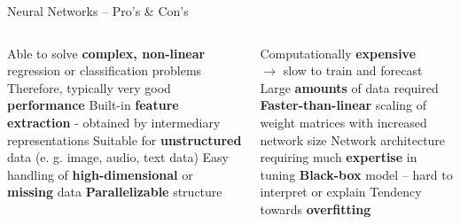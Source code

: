 \begin{frame}{Neural Networks -- Pro's \& Con's}

\footnotesize

\begin{columns}[onlytextwidth]
  \begin{column}{0.5\textwidth}
    \footnotesize
    \begin{itemize}
      \positem Able to solve \textbf{complex, non-linear} regression or 
      classification problems
      \positem Therefore, typically very good \textbf{performance}
      \positem Built-in \textbf{feature extraction} - obtained by intermediary
      representations
      \positem Suitable for \textbf{unstructured} data (e. g. image, audio, 
      text data)
      \positem Easy handling of \textbf{high-dimensional} or \textbf{missing} 
      data
      \positem \textbf{Parallelizable} structure
    \end{itemize}
  \end{column}

  \begin{column}{0.5\textwidth}
    \footnotesize
    \begin{itemize}
      \negitem Computationally \textbf {expensive} \\
      $\rightarrow$ slow to train and forecast
      \negitem Large \textbf{amounts} of data required 
      \negitem \textbf{Faster-than-linear} scaling of weight matrices with 
      increased network size 
      \negitem Network architecture requiring much \textbf{expertise} in tuning
      \negitem \textbf{Black-box} model -- hard to interpret or explain
      \negitem Tendency towards \textbf{overfitting}
      
    \end{itemize}
  \end{column}
\end{columns}

\vfill

\small


\end{frame}


